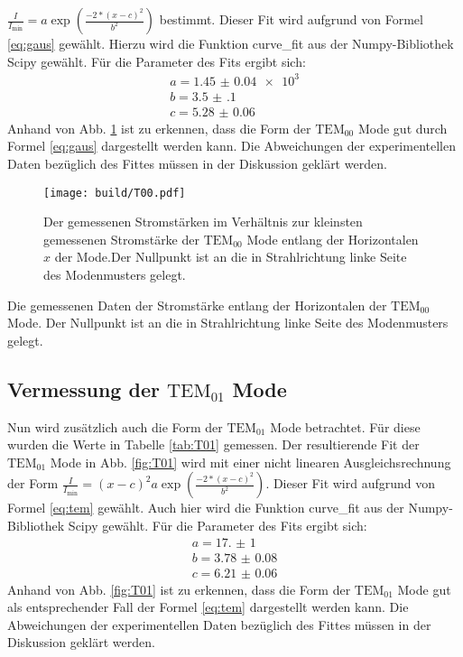 	$\frac{I}{I_\text{min}} = a \exp \left( \frac{-2*(x-c)^2}{b^2}\right)$
bestimmt. Dieser Fit wird aufgrund von Formel \eqref{eq:gaus} gewählt. Hierzu wird die Funktion curve\_fit aus der Numpy-Bibliothek Scipy \cite{scipy} gewählt. Für die Parameter des Fits ergibt sich:
\begin{gather*}
a = \num{1.45(4)e3}\\
b = \num{3.5(1)}\\
c = \num{5.28(6)}
\end{gather*}
Anhand von Abb. \ref{fig:T00} ist zu erkennen, dass die Form der $\text{TEM}_\text{00}$ Mode gut durch Formel \eqref{eq:gaus} dargestellt werden kann. Die Abweichungen der experimentellen Daten bezüglich des Fittes müssen in der Diskussion geklärt werden.



\begin{figure}
	\centering
	\texttt{[image: build/T00.pdf]}
	\caption{Der gemessenen Stromstärken im Verhältnis zur kleinsten gemessenen Stromstärke der $\text{TEM}_{00}$ Mode entlang der Horizontalen $x$ der Mode.Der Nullpunkt ist an die in Strahlrichtung linke Seite des Modenmusters gelegt.}
	\label{fig:T00}
\end{figure}

\begin{table}
	\centering
	\caption{Die gemessenen Daten der Stromstärke entlang der Horizontalen der $\text{TEM}_{\text{00}}$ Mode. Der Nullpunkt ist an die in Strahlrichtung linke Seite des Modenmusters gelegt.}
	
	\label{tab:T00}
\end{table}


\subsection{Vermessung der $\text{TEM}_{01}$ Mode}
Nun wird zusätzlich auch die Form der $\text{TEM}_\text{01}$ Mode betrachtet. Für diese wurden die Werte in Tabelle \ref{tab:T01} gemessen. 
Der resultierende Fit der $\text{TEM}_\text{01}$ Mode in Abb. \ref{fig:T01} wird mit einer nicht linearen Ausgleichsrechnung der Form $\frac{I}{I_\text{min}} =  (x-c)^2 a \exp \left( \frac{-2*(x-c)^2}{b^2}\right)$. Dieser Fit wird aufgrund von Formel \eqref{eq:tem} gewählt. Auch hier wird die Funktion curve\_fit aus der Numpy-Bibliothek Scipy \cite{scipy} gewählt. Für die Parameter des Fits ergibt sich:
\begin{gather*}
a = \num{17.(1)}\\
b = \num{3.78(8)}\\
c = \num{6.21(6)}
\end{gather*}
Anhand von Abb. \ref{fig:T01} ist zu erkennen, dass die Form der $\text{TEM}_\text{01}$ Mode gut als entsprechender Fall der Formel \eqref{eq:tem} dargestellt werden kann. Die Abweichungen der experimentellen Daten bezüglich des Fittes müssen in der Diskussion geklärt werden.


